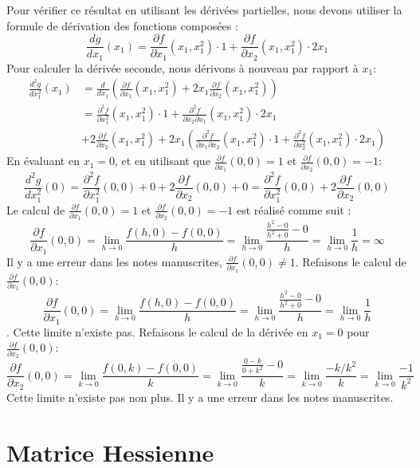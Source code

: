 \documentclass{article}
\begin{document}
Pour vérifier ce résultat en utilisant les dérivées partielles, nous devons utiliser la formule de dérivation des fonctions composées :
\[ \frac{dg}{dx_1}(x_1) = \frac{\partial f}{\partial x_1}(x_1, x_1^2) \cdot 1 + \frac{\partial f}{\partial x_2}(x_1, x_1^2) \cdot 2x_1 \]
Pour calculer la dérivée seconde, nous dérivons à nouveau par rapport à $x_1$:
\begin{align*}
    \frac{d^2g}{dx_1^2}(x_1) &= \frac{d}{dx_1} \left( \frac{\partial f}{\partial x_1}(x_1, x_1^2) + 2x_1 \frac{\partial f}{\partial x_2}(x_1, x_1^2) \right) \\
    &= \frac{\partial^2 f}{\partial x_1^2}(x_1, x_1^2) \cdot 1 + \frac{\partial^2 f}{\partial x_2 \partial x_1}(x_1, x_1^2) \cdot 2x_1 \\
    &+ 2 \frac{\partial f}{\partial x_2}(x_1, x_1^2) + 2x_1 \left( \frac{\partial^2 f}{\partial x_1 \partial x_2}(x_1, x_1^2) \cdot 1 + \frac{\partial^2 f}{\partial x_2^2}(x_1, x_1^2) \cdot 2x_1 \right)
\end{align*}
En évaluant en $x_1 = 0$, et en utilisant que $\frac{\partial f}{\partial x_1}(0, 0) = 1$ et $\frac{\partial f}{\partial x_2}(0, 0) = -1$:
\[ \frac{d^2g}{dx_1^2}(0) = \frac{\partial^2 f}{\partial x_1^2}(0, 0) + 0 + 2 \frac{\partial f}{\partial x_2}(0, 0) + 0 = \frac{\partial^2 f}{\partial x_1^2}(0, 0) + 2 \frac{\partial f}{\partial x_2}(0, 0) \]
Le calcul de $\frac{\partial f}{\partial x_1}(0,0) = 1$ et $\frac{\partial f}{\partial x_2}(0,0) = -1$ est réalisé comme suit :
\[ \frac{\partial f}{\partial x_1}(0, 0) = \lim_{h \to 0} \frac{f(h, 0) - f(0, 0)}{h} = \lim_{h \to 0} \frac{\frac{h^2 - 0}{h^2 + 0} - 0}{h} = \lim_{h \to 0} \frac{1}{h} = \infty \]
Il y a une erreur dans les notes manuscrites, $\frac{\partial f}{\partial x_1}(0, 0) \neq 1$.
Refaisons le calcul de  $\frac{\partial f}{\partial x_1}(0, 0)$:
 \[ \frac{\partial f}{\partial x_1}(0, 0) = \lim_{h \to 0} \frac{f(h, 0) - f(0, 0)}{h} = \lim_{h \to 0} \frac{\frac{h^2 - 0}{h^2 + 0} - 0}{h} = \lim_{h \to 0} \frac{1}{h} \].
Cette limite n'existe pas. Refaisons le calcul de la dérivée en $x_1=0$ pour $\frac{\partial f}{\partial x_2}(0,0)$:
\[ \frac{\partial f}{\partial x_2}(0, 0) = \lim_{k \to 0} \frac{f(0, k) - f(0, 0)}{k} = \lim_{k \to 0} \frac{\frac{0 - k}{0 + k^2} - 0}{k} = \lim_{k \to 0} \frac{-k/k^2}{k} = \lim_{k \to 0} \frac{-1}{k^2} \]
Cette limite n'existe pas non plus. Il y a une erreur dans les notes manuscrites.

\section{Matrice Hessienne}
\end{document}
